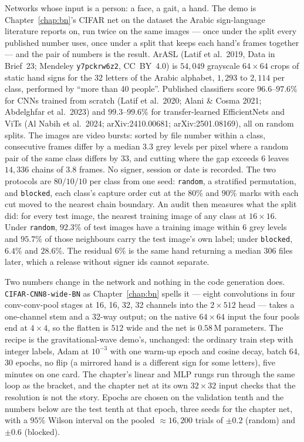 Networks whose input is a person: a face, a gait, a hand. The demo is
Chapter~\ref{chap:bn}'s CIFAR net on the dataset the Arabic sign-language
literature reports on, run twice on the same images --- once under the
split every published number uses, once under a split that keeps each
hand's frames together --- and the pair of numbers is the result. ArASL
(Latif et al.\ 2019, Data in Brief~23; Mendeley \texttt{y7pckrw6z2}, CC~BY~4.0)
is $54{,}049$ grayscale $64\times64$ crops of static hand signs for the 32
letters of the Arabic alphabet, $1{,}293$ to $2{,}114$ per class, performed
by ``more than 40 people''. Published classifiers score $96.6$--$97.6\%$ for
CNNs trained from scratch (Latif et al.\ 2020; Alani \& Cosma 2021;
Abdelghfar et al.\ 2023) and $99.3$--$99.6\%$ for transfer-learned
EfficientNets and ViTs (Al Nabih et al.\ 2024; arXiv:2410.00681;
arXiv:2501.08169), all on random splits. The images are video bursts:
sorted by file number within a class, consecutive frames differ by a median
$3.3$ grey levels per pixel where a random pair of the same class differs by
$33$, and cutting where the gap exceeds $6$ leaves $14{,}336$ chains of $3.8$
frames. No signer, session or date is recorded. The two protocols are
$80/10/10$ per class from one seed: \texttt{random}, a stratified
permutation, and \texttt{blocked}, each class's capture order cut at the
$80\%$ and $90\%$ marks with each cut moved to the nearest chain boundary.
An audit then measures what the split did: for every test image, the
nearest training image of any class at $16\times16$. Under \texttt{random},
$92.3\%$ of test images have a training image within $6$ grey levels and
$95.7\%$ of those neighbours carry the test image's own label; under
\texttt{blocked}, $6.4\%$ and $28.6\%$. The residual $6\%$ is the same hand
returning a median $306$ files later, which a release without signer ids
cannot separate.

Two numbers change in the network and nothing in the code generation does.
\texttt{CIFAR-CNN8-wide-BN} as Chapter~\ref{chap:bn} spells it --- eight
convolutions in four conv-conv-pool stages at 16, 16, 32, 32 channels into
the $2\times512$ head --- takes a one-channel stem and a 32-way output; on
the native $64\times64$ input the four pools end at $4\times4$, so the
flatten is $512$ wide and the net is $0.58$\,M parameters. The recipe is the
gravitational-wave demo's, unchanged: the ordinary train step with integer
labels, Adam at $10^{-3}$ with one warm-up epoch and cosine decay, batch 64,
30 epochs, no flip (a mirrored hand is a different sign for some letters),
five minutes on one card. The chapter's linear and MLP rungs run through
the same loop as the bracket, and the chapter net at its own $32\times32$
input checks that the resolution is not the story. Epochs are chosen on
the validation tenth and the numbers below are the test tenth at that
epoch, three seeds for the chapter net, with a $95\%$ Wilson interval on
the pooled $\approx 16{,}200$ trials of $\pm 0.2$ (random) and $\pm 0.6$ (blocked).

